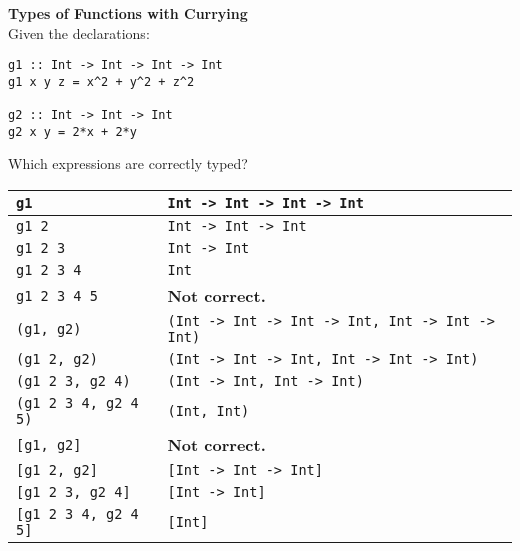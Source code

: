 \textbf{Types of Functions with Currying}\\
Given the declarations:
\begin{lstlisting}
g1 :: Int -> Int -> Int -> Int
g1 x y z = x^2 + y^2 + z^2

g2 :: Int -> Int -> Int
g2 x y = 2*x + 2*y
\end{lstlisting}
Which expressions are correctly typed?\\
\begin{tabularx}{\linewidth}{|l|X|}
  \hline
  \lstinline|g1| & \lstinline|Int -> Int -> Int -> Int|\\
  \hline
  \lstinline|g1 2| & \lstinline|Int -> Int -> Int|\\
  \hline
  \lstinline|g1 2 3| & \lstinline|Int -> Int|\\
  \hline
  \lstinline|g1 2 3 4| & \lstinline|Int|\\
  \hline
  \lstinline|g1 2 3 4 5| & \textbf{Not correct.}\\
  \hline
  \lstinline|(g1, g2)| & \lstinline|(Int -> Int -> Int -> Int, Int -> Int -> Int)|\\
  \hline
  \lstinline|(g1 2, g2)| & \lstinline|(Int -> Int -> Int, Int -> Int -> Int)|\\
  \hline
  \lstinline|(g1 2 3, g2 4)| & \lstinline|(Int -> Int, Int -> Int)|\\
  \hline
  \lstinline|(g1 2 3 4, g2 4 5)| & \lstinline|(Int, Int)|\\
  \hline
  \lstinline|[g1, g2]| & \textbf{Not correct.}\\
  \hline
  \lstinline|[g1 2, g2]| & \lstinline|[Int -> Int -> Int]|\\
  \hline
  \lstinline|[g1 2 3, g2 4]| & \lstinline|[Int -> Int]|\\
  \hline
  \lstinline|[g1 2 3 4, g2 4 5]| & \lstinline|[Int]|\\
  \hline
\end{tabularx}


